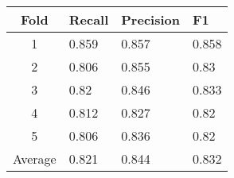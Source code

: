 \begin{tabular}{clll} 
\hline 
Fold & Recall & Precision & F1 \\ 
\hline 
1 & 0.859 & 0.857 & 0.858 \\ 
  2 & 0.806 & 0.855 & 0.83 \\ 
  3 & 0.82 & 0.846 & 0.833 \\ 
  4 & 0.812 & 0.827 & 0.82 \\ 
  5 & 0.806 & 0.836 & 0.82 \\ 
 \hline 
Average & 0.821 & 0.844 & 0.832 \\ 
 \hline 
\end{tabular}